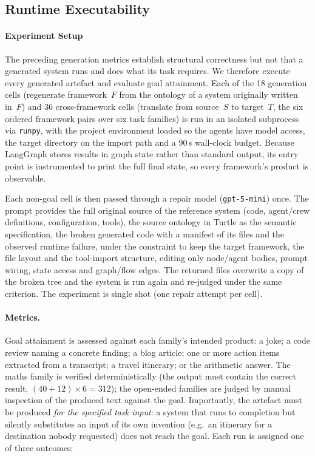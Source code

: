 \subsection{Runtime Executability}
\label{sec:eval-runtime}
\paragraph{Experiment Setup}

The preceding generation metrics establish structural correctness but not that a generated
system runs and does what its task requires. We therefore execute every generated
artefact and evaluate goal attainment. Each of the 18 generation cells (regenerate
framework~$F$ from the ontology of a system originally written in~$F$) and 36
cross-framework cells (translate from source~$S$ to target~$T$, the six ordered
framework pairs over six task families) is run in an isolated subprocess via
\texttt{runpy}, with the project environment loaded so the agents have model
access, the target directory on the import path and a 90\,s wall-clock budget.
Because LangGraph stores results in graph state rather than standard output, its
entry point is instrumented to print the full final state, so every framework's
product is observable.

Each non-goal cell is then passed through a repair model (\texttt{gpt-5-mini}) once. The prompt provides the full original source of the reference system (code, agent/crew definitions, configuration, tools), the source ontology in Turtle as the semantic specification, the broken generated code with a manifest of its files and the observed runtime failure, under the constraint to keep the target framework, the file layout and the tool-import structure, editing only node/agent bodies, prompt wiring, state access and graph/flow edges. The returned files overwrite a copy of the broken tree and the system is run again and re-judged under the same criterion.
The experiment is single shot (one repair attempt per cell).

\paragraph{Metrics.}

Goal attainment is assessed against each family's intended product: a joke; a code
review naming a concrete finding; a blog article; one or more action items
extracted from a transcript; a travel itinerary; or the arithmetic answer. The
maths family is verified deterministically (the output must contain the
correct result, $(40+12)\times 6 = 312$); the open-ended families are judged by
manual inspection of the produced text against the goal. Importantly, the
artefact must be produced \emph{for the specified task input}: a system that
runs to completion but silently substitutes an input of its own invention (e.g.\
an itinerary for a destination nobody requested) does not reach the goal. Each
run is assigned one of three outcomes:

